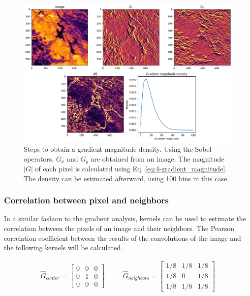          \begin{figure}[H]
             \centering
             \includegraphics[width=\textwidth]{Includes/4-gradient-analysis.pdf}
             \caption{Steps to obtain a gradient magnitude density. Using the Sobel operators, $G_x$ and $G_y$ are obtained from an image. The magnitude $|G|$ of each pixel is calculated using Eq. \ref{eq:4-gradient_magnitude}. The density can be estimated afterward, using 100 bins in this case.}
             \label{fig:4-gradient-analysis}
         \end{figure}


      \subsubsection{Correlation between pixel and neighbors }


        In a similar fashion to the gradient analysis, kernels can be used to estimate the correlation between the pixels of an image and their neighbors. The Pearson correlation coefficient between the results of the convolutions of the image and the following kernels will be calculated.
        
        \begin{equation}
            \begin{array}{ccc}
            \hat{G}_{center} = \begin{bmatrix}
            0 & 0 & 0 \\
            0 & 1 & 0 \\
            0 & 0 & 0
            \end{bmatrix}
            &
            \quad
            &
            \hat{G}_{neighbors} = \begin{bmatrix}
             1/8 &  1/8 & 1/8 \\
             1/8 &  0 & 1/8 \\
            1/8 & 1/8 & 1/8
            \end{bmatrix}
            \end{array}
            \label{eq:4-sobel-operators}
        \end{equation}
    
